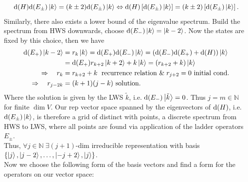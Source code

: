 \begin{equation*}
\mathrm{d}(H) \mathrm{d} (E_\pm) \ket{k}= (k\pm 2) \mathrm{d}(E_\pm) \ket{k} \Leftrightarrow \mathrm{d}(H) \left[\mathrm{d}(E_\pm)\ket{k}\right]=(k\pm2) \left[\mathrm{d}(E_\pm) \ket{k}\right].
\end{equation*}
Similarly, there also exists a lower bound of the eigenvalue spectrum. Build the spectrum from HWS downwards, choose $\mathrm{d}(E_-) \ket{k}= \ket{k-2}$. Now the states are fixed by this choice, then we have
\begin{align*}
\mathrm{d}(E_+) \ket{k-2} &= r_k \ket{k} = \mathrm{d}(E_+) \mathrm{d}(E_-) \ket{k} = \left(\mathrm{d}(E_-)\mathrm{d}(E_+)+\mathrm{d}(H)\right) \ket{k} \\
&= \mathrm{d}(E_+) r_{k+2} \ket{k+2} + k\ket{k} = (r_{k+2}+k) \ket{k} \\
\Rightarrow \quad r_k &= r_{k+2} + k \;\text{ recurrence relation } \& \; r_{j+2} = 0 \text{ initial cond.} \\
  \Rightarrow \quad r_{j-2k}&=(k+1)(j-k) \text{ solution}.
\end{align*}
Where the solution is given by the LWS $\tilde{k}$, i.e. $\mathrm{d}(E_-)\ket{\tilde{k}}=0$. Thus $j=m\in \mathbb{N}$ for finite $\dim V$. Our rep vector space spanned by the eigenvectors of $\mathrm{d}(H)$, i.e. $\mathrm{d}(E_\pm)\ket{k}$, is therefore a grid of distinct with points, a discrete spectrum from HWS to LWS, where all points are found via application of the ladder operators $E_\pm$.\\
Thus, $\forall j\in \mathbb{N} \; \exists (j+1)$-dim irreducible representation with basis \\$\{\ket{j},\ket{j-2},\dots,\ket{-j+2},\ket{j}\}$.\\
Now we choose the following form of the basis vectors and find a form for the operators on our vector space:

